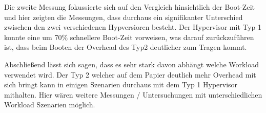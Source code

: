 \documentclass[conference]{IEEEtran}
\begin{document}
Die zweite Messung fokussierte sich auf den Vergleich hinsichtlich der Boot-Zeit und hier zeigten die Messungen, dass durchaus ein signifikanter Unterschied zwischen den zwei verschiedenen Hypversioren besteht. Der Hypervisor mit Typ 1 konnte eine um 70\% schnellere Boot-Zeit vorweisen, was darauf zurückzuführen ist, dass beim Booten der Overhead des Typ2 deutlicher zum Tragen kommt. 

Abschließend lässt sich sagen, dass es sehr stark davon abhängt welche Workload verwendet wird. Der Typ 2 welcher auf dem Papier deutlich mehr Overhead mit sich bringt kann in einigen Szenarien durchaus mit dem Typ 1 Hypervisor mithalten. Hier wären weitere Messungen / Untersuchungen mit unterschiedlichen Workload Szenarien möglich.




\listoffigures
\end{document}
